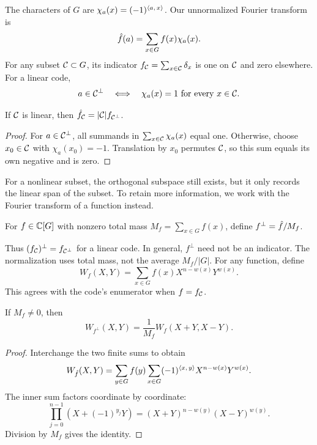 The characters of $G$ are $\chi_a(x)=(-1)^{\langle a,\,x\rangle}$. Our
unnormalized Fourier transform is
\[
 \hat{f}(a)=\sum_{x\in G}f(x)\chi_a(x).
\]
For any subset $\mathcal{C}\subset G$, its indicator $f_{\mathcal{C}}=\sum_{x\in\mathcal{C}}\delta_x$
is one on $\mathcal{C}$ and zero elsewhere. For a linear code,
\begin{equation}
\label{eq-equivalence-orthogonalite-caractere2}
 a\in\mathcal{C}^\bot\quad\Longleftrightarrow\quad
 \chi_a(x)=1\text{ for every }x\in\mathcal{C}.
\end{equation}


\begin{prop}
\label{prop-trans-fourier-indicator-function}
If $\mathcal{C}$ is linear, then $\hat{f}_{\mathcal{C}}=|\mathcal{C}|f_{\mathcal{C}^\bot}$.
\end{prop}
\begin{proof}
For $a\in\mathcal{C}^\bot$, all summands in $\sum_{x\in\mathcal{C}}\chi_a(x)$ equal one.
Otherwise, choose $x_0\in\mathcal{C}$ with $\chi_a(x_0)=-1$. Translation by $x_0$
permutes $\mathcal{C}$, so this sum equals its own negative and is zero.
\end{proof}
For a nonlinear subset, the orthogonal subspace still exists, but it only
records the linear span of the subset. To retain more information, we work
with the Fourier transform of a function instead.

\begin{defn}
For $f\in\mathbb{C}[G]$ with nonzero total mass
$M_f=\sum_{x\in G}f(x)$, define $f^\bot=\hat{f}/M_f$.
\end{defn}
Thus $(f_{\mathcal{C}})^\bot=f_{\mathcal{C}^\bot}$ for a linear code. In general, $f^\bot$
need not be an indicator. The normalization uses total mass, not the
average $M_f/|G|$.
For any function, define
\[
 W_f(X,Y)=\sum_{x\in G}f(x)X^{n-w(x)}Y^{w(x)}.
\]
This agrees with the code's enumerator when $f=f_{\mathcal{C}}$.


\begin{thm}
\label{thm-id-mac-williams-functions}
If $M_f\ne0$, then
\begin{equation}
\label{eq-id-mac-williams-function}
 W_{f^\bot}(X,Y)=\frac1{M_f}W_f(X+Y,X-Y).
\end{equation}
\end{thm}
\begin{proof}
Interchange the two finite sums to obtain
\[
 W_{\hat{f}}(X,Y)=\sum_{y\in G}f(y)
       \sum_{x\in G}(-1)^{\langle x,\,y\rangle}X^{n-w(x)}Y^{w(x)}.
\]
The inner sum factors coordinate by coordinate:
\[
 \prod_{j=0}^{n-1}(X+(-1)^{y_j}Y)
       =(X+Y)^{n-w(y)}(X-Y)^{w(y)}.
\]
Division by $M_f$ gives the identity.
\end{proof}

